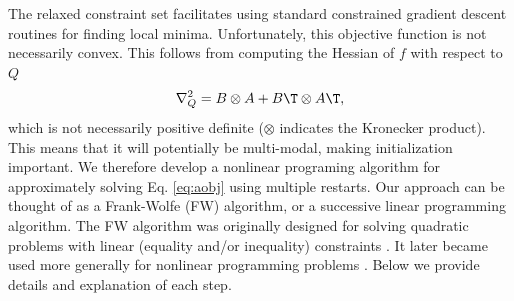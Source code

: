 \documentclass[10pt,journal,cspaper,compsoc]{IEEEtran}
\begin{document}

The relaxed constraint set facilitates using standard constrained gradient descent routines for finding local minima.  Unfortunately, this objective function is not necessarily convex.  This follows from computing the Hessian of $f$  with respect to $Q$
\begin{align}
	\nabla_Q^2  =  B \otimes A + B\T \otimes A\T,
\end{align}
which is not necessarily positive definite ($\otimes$ indicates the Kronecker product). This means that it will potentially be multi-modal, making initialization important.   We therefore develop a nonlinear programing algorithm for approximately solving Eq. \eqref{eq:aobj} using multiple restarts.   Our approach can be thought of as a Frank-Wolfe (FW) algorithm, or a successive linear programming algorithm.  The FW algorithm was originally designed for solving quadratic problems with linear (equality and/or inequality) constraints \cite{Frank1956}. It later became used more generally for nonlinear programming problems \cite{Bradley1977}.  
Below we provide details and explanation of each step.
\end{document}
